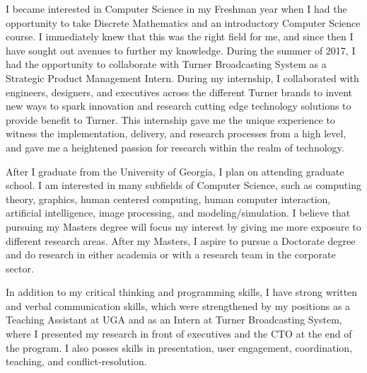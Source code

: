 \documentclass{letter} %
\begin{document}
\noindent I became interested in Computer Science in my Freshman year when I had the opportunity to take Discrete Mathematics and an introductory Computer Science course. I immediately knew that this was the right field for me, and since then I have sought out avenues to further my knowledge. During the summer of 2017, I had the opportunity to collaborate with Turner Broadcasting System as a Strategic Product Management Intern. During my internship, I collaborated with engineers, designers, and executives across the different Turner brands to invent new ways to spark innovation and research cutting edge technology solutions to provide benefit to Turner. This internship gave me the unique experience to witness the implementation, delivery, and research processes from a high level, and gave me a heightened passion for research within the realm of technology.


\noindent After I graduate from the University of Georgia, I plan on attending graduate school. I am interested in many subfields of Computer Science, such as computing theory, graphics, human centered computing, human computer interaction, artificial intelligence, image processing, and modeling/simulation. I believe that pursuing my Masters degree will focus my interest by giving me more exposure to different research areas. After my Masters, I aspire to pursue a Doctorate degree and do research in either academia or with a research team in the corporate sector.




\noindent In addition to my critical thinking and programming skills, I have strong written and verbal communication skills, which were strengthened by my positions as a Teaching Assistant at UGA and as an Intern at Turner Broadcasting System, where I presented my research in front of executives and the CTO at the end of the program. I also posses skills in presentation, user engagement, coordination, teaching, and conflict-resolution.
\end{document}
